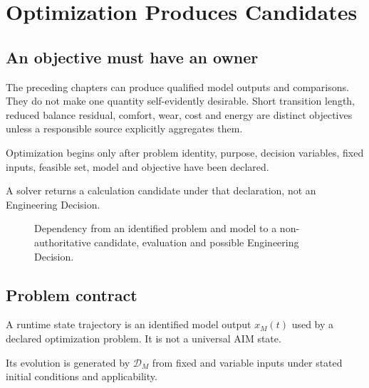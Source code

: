\chapter{Optimization Produces Candidates}
\label{chap:optimization-in-state-space}

\section*{An objective must have an owner}

The preceding chapters can produce qualified model outputs and comparisons.
They do not make one quantity self-evidently desirable. Short transition
length, reduced balance residual, comfort, wear, cost and energy are distinct
objectives unless a responsible source explicitly aggregates them.

\begin{principle}
\label{princ:state-space-optimization}
Optimization begins only after problem identity, purpose, decision variables,
fixed inputs, feasible set, model and objective have been declared.
\end{principle}

\begin{principle}
\label{princ:trajectory-shaping}
A solver returns a calculation candidate under that declaration, not an
Engineering Decision.
\end{principle}

\begin{figure}[htbp]
\centering

\caption{Dependency from an identified problem and model to a non-authoritative candidate, evaluation and possible Engineering Decision.}
\label{fig:model-candidate-decision}
\end{figure}

\section{Problem contract}

\begin{definition}
\label{def:runtime-state-trajectory}
A runtime state trajectory is an identified model output
\(x_M(t)\) used by a declared optimization problem. It is not a universal AIM
state.
\end{definition}

\begin{definition}
\label{def:optimization-runtime-state-evolution}
Its evolution is generated by \(\mathcal D_M\) from fixed and variable inputs
under stated initial conditions and applicability.
\end{definition}

